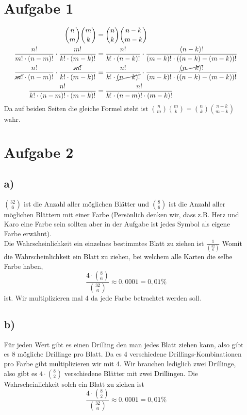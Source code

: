 \documentclass[12pt,german,a4paper]{article}
\title{#1}
\author{Mike Lenz, Jonas Tesfamariam}
\begin{document}
\maketitle	

\section*{Aufgabe 1}
\begin{align*}
	\binom{n}{m}\binom{m}{k}&=\binom{n}{k}\binom{n-k}{m-k} \\
  \frac{ n! }{ m!\cdot(n-m)! }\cdot \frac{ m! }{ k!\cdot(m-k)! } &= \frac{ n! }{ k!\cdot(n-k)! }\cdot \frac{ (n-k)! }{ (m-k)!\cdot((n-k)-(m-k))! } \\
	\frac{ n! }{ \cancel{m!}\cdot(n-m)! }\cdot \frac{ \cancel{m!} }{ k!\cdot(m-k)! } &= \frac{ n! }{ k!\cdot\cancel{(n-k)!} }\cdot \frac{ \cancel{(n-k)!} }{ (m-k)!\cdot((n-k)-(m-k))! } \\ 
	\frac{ n! }{ k!\cdot (n-m)!\cdot(m-k)! } &= \frac{ n! }{ k!\cdot (n-m)!\cdot(m-k)! } 
\end{align*}
Da auf beiden Seiten die gleiche Formel steht ist $\binom{n}{m}\binom{m}{k}=\binom{n}{k}\binom{n-k}{m-k}$ wahr. 
\pagebreak
\section*{Aufgabe 2}
\subsection*{a)}
$\binom{32}{6}$ ist die Anzahl aller möglichen Blätter und $\binom{8}{6}$ ist die Anzahl aller möglichen Blättern mit einer Farbe (Persönlich denken wir, dass z.B. Herz und Karo eine Farbe sein sollten aber in der Aufgabe ist jedes Symbol als eigene Farbe erwähnt). \\
Die Wahrscheinlichkeit ein einzelnes bestimmtes Blatt zu ziehen ist 
$\frac{ 1 }{ \binom{32}{6}}$
Womit die Wahrscheinlichkeit ein Blatt zu ziehen, bei welchem alle Karten die selbe Farbe haben,
$$
\frac{ 4\cdot\binom{8}{6} }{ \binom{32}{6} } \approx 0,0001 = 0,01\%
$$
ist. Wir multiplizieren mal 4 da jede Farbe betrachtet werden soll.
\subsection*{b)}
Für jeden Wert gibt es einen Drilling den man jedes Blatt ziehen kann, also gibt es 8 mögliche Drillinge pro Blatt. Da es 4 verschiedene Drillings-Kombinationen pro Farbe gibt multiplizieren wir mit 4. Wir brauchen lediglich zwei Drillinge, also gibt es
$4\cdot\binom{8}{2}$ verschiedene Blätter mit zwei Drillingen.
Die Wahrscheinlichkeit solch ein Blatt zu ziehen ist
$$
\frac{ 4\cdot\binom{8}{2} }{ \binom{32}{6} } \approx 0,0001 = 0,01\%
$$
\pagebreak
\end{document}
